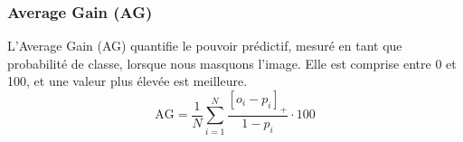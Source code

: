 \subsubsection{Average Gain (AG)}
L'Average Gain (AG) quantifie le pouvoir prédictif, mesuré en tant que probabilité de classe, lorsque nous masquons l'image. Elle est comprise entre 0 et 100, et une valeur plus élevée est meilleure.
\begin{equation}
    \text{AG} = \frac{1}{N} \sum_{i=1}^{N} \frac{[o_i - p_i]_+}{1 - p_i} \cdot 100
\end{equation}

